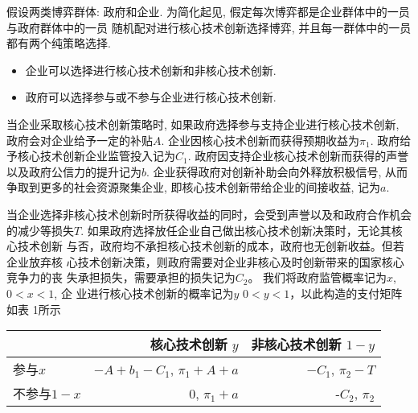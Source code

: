 \documentclass[UTF8]{ctexart}
\begin{document}
假设两类博弈群体: 政府和企业.
为简化起见,
假定每次博弈都是企业群体中的一员与政府群体中的一员
随机配对进行核心技术创新选择博弈,
并且每一群体中的一员都有两个纯策略选择.

\begin{itemize}
\item 企业可以选择进行核心技术创新和非核心技术创新.
\item 政府可以选择参与或不参与企业进行核心技术创新.
\end{itemize}

当企业采取核心技术创新策略时,
如果政府选择参与支持企业进行核心技术创新,
政府会对企业给予一定的补贴$A$.
企业因核心技术创新而获得预期收益为$\pi_1$.
政府给予核心技术创新企业监管投入记为$C_1$.
政府因支持企业核心技术创新而获得的声誉以及政府公信力的提升记为$b$.
企业获得政府对创新补助会向外释放积极信号,
从而争取到更多的社会资源聚集企业,
即核心技术创新带给企业的间接收益,
记为$a$.

当企业选择非核心技术创新时所获得收益的同时，会受到声誉以及和政府合作机会的减少等损失$T$.
如果政府选择放任企业自己做出核心技术创新决策时，无论其核心技术创新
与否，政府均不承担核心技术创新的成本，政府也无创新收益。但若企业放弃核
心技术创新决策，则政府需要对企业非核心及时创新带来的国家核心竞争力的丧
失承担损失，需要承担的损失记为$C_2$。
我们将政府监管概率记为$x$, $0 < x < 1$, 企
业进行核心技术创新的概率记为$y$ $0 < y < 1$，以此构造的支付矩阵如表 1所示

\begin{tabular}{l|r|r}
             & 核心技术创新 $y$ & 非核心技术创新 $1-y$ \\
\hline
参与$x$      & $-A+b_1-C_1$, $\pi_1+A+a$  & $-C_1$, $\pi_2-T$ \\
\hline
不参与$1-x$  & $0$, $\pi_1+a$ & -$C_2$, $\pi_2$ \\
\end{tabular}
\end{document}
